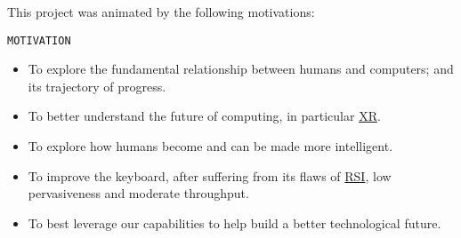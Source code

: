 \documentclass[logo,bsc,singlespacing,parskip]{infthesis}
\begin{document}
This project was animated by the following motivations:

\begin{mdframed}
\begin{description}
\item[{\texttt{MOTIVATION}}] 
\end{description}


\begin{itemize}
\item To explore the fundamental relationship between humans and computers; and its trajectory of progress.

\item To better understand the future of computing, in particular \hyperref[org88b0f70]{XR}.

\item To explore how humans become and can be made more intelligent.

\item To improve the keyboard, after suffering from its flaws of \hyperref[org503fc2d]{RSI}, low pervasiveness and moderate throughput.

\item To best leverage our capabilities to help build a better technological future.
\end{itemize}
\end{mdframed}
\end{document}
